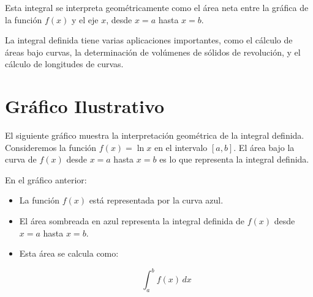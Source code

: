 Esta integral se interpreta geométricamente como el área neta entre la gráfica de la función \( f(x) \) y el eje \( x \), desde \( x = a \) hasta \( x = b \). 

La integral definida tiene varias aplicaciones importantes, como el cálculo de áreas bajo curvas, la determinación de volúmenes de sólidos de revolución, y el cálculo de longitudes de curvas.

\section{Gráfico Ilustrativo}

El siguiente gráfico muestra la interpretación geométrica de la integral definida. Consideremos la función \( f(x) = \ln{x}\) en el intervalo \([a, b]\). El área bajo la curva de \( f(x) \) desde \( x = a \) hasta \( x = b \) es lo que representa la integral definida.

    \begin{center}
\end{center}

En el gráfico anterior:

\begin{itemize}
    \item La función \( f(x) \) está representada por la curva azul.
    \item El área sombreada en azul representa la integral definida de \( f(x) \) desde \( x = a \) hasta \( x = b \).
    \item Esta área se calcula como:

    \[
    \int_{a}^{b} f(x) \, dx
    \]
\end{itemize}

